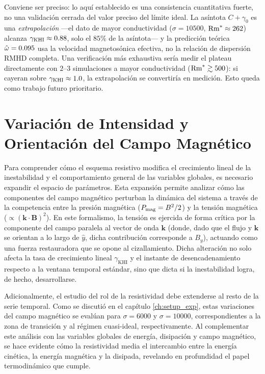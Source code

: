 \primerparrafo Conviene ser preciso: lo aquí establecido es una consistencia cuantitativa fuerte, no una validación cerrada del valor preciso del límite ideal. La asíntota $C+\gamma_0$ es una \emph{extrapolación} ---el dato de mayor conductividad ($\sigma=10500$, $\mathrm{Rm}^{*}\approx262$) alcanza $\gamma_{\mathrm{KHI}}\approx0.88$, solo el $85\%$ de la asíntota--- y la predicción teórica $\hat{\omega}=0.095$ usa la velocidad magnetosónica efectiva, no la relación de dispersión RMHD completa. Una verificación más exhaustiva sería medir el plateau directamente con $2$--$3$ simulaciones a mayor conductividad ($\mathrm{Rm}^{*}\gtrsim500$): si cayeran sobre $\gamma_{\mathrm{KHI}}\approx1.0$, la extrapolación se convertiría en medición. Esto queda como trabajo futuro prioritario.

\section[Variación del campo magnético]{Variación de Intensidad y Orientación del Campo Magnético}
\label{sec:campana_magnetica}

Para comprender cómo el esquema resistivo modifica el crecimiento lineal de la inestabilidad y el comportamiento general de las variables globales, es necesario expandir el espacio de parámetros. Esta expansión permite analizar cómo las componentes del campo magnético perturban la dinámica del sistema a través de la competencia entre la presión magnética ($P_{\rm mag}=B^2/2$) y la tensión magnética ($\propto(\mathbf{k}\cdot\mathbf{B})^2$). En este formalismo, la tensión es ejercida de forma crítica por la componente del campo paralela al vector de onda $\mathbf{k}$ (donde, dado que el flujo y $\mathbf{k}$ se orientan a lo largo de $\hat{y}$, dicha contribución corresponde a $B_y$), actuando como una fuerza restauradora que se opone al cizallamiento. Dicha alteración no solo afecta la tasa de crecimiento lineal $\gamma_{\text{KHI}}$ y el instante de desencadenamiento respecto a la ventana temporal estándar, sino que dicta si la inestabilidad logra, de hecho, desarrollarse.

Adicionalmente, el estudio del rol de la resistividad debe extenderse al resto de la serie temporal. Como se discutió en el capítulo \ref{ch:setup_exp}, estas variaciones del campo magnético se evalúan para $\sigma = 6000$ y $\sigma = 10000$, correspondientes a la zona de transición y al régimen cuasi-ideal, respectivamente. Al complementar este análisis con las variables globales de energía, disipación y campo magnético, se hace evidente cómo la resistividad media el intercambio entre la energía cinética, la energía magnética y la disipada, revelando en profundidad el papel termodinámico que cumple.

